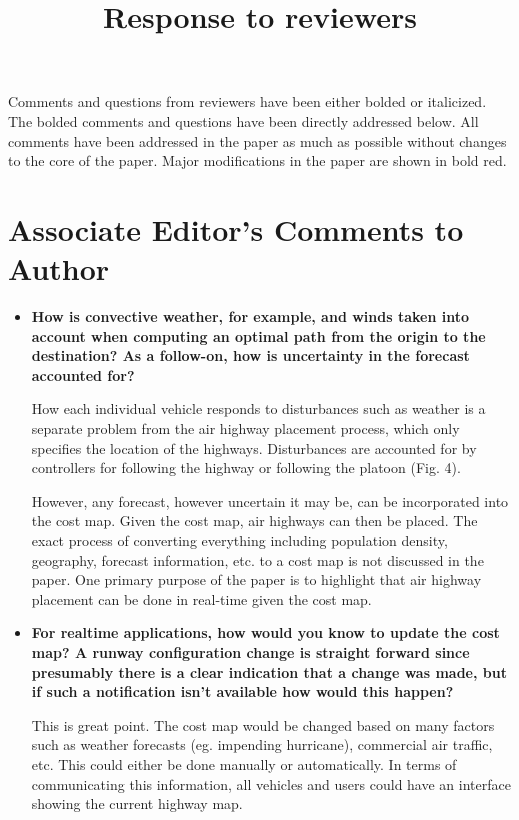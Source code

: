 \documentclass[submit]{aiaa-pretty}
\title{Response to reviewers}
\begin{document}
\maketitle

Comments and questions from reviewers have been either bolded or italicized. The bolded comments and questions have been directly addressed below. All comments have been addressed in the paper as much as possible without changes to the core of the paper. Major modifications in the paper are shown in bold red.

\section{Associate Editor's Comments to Author}
\begin{itemize}
\item\textbf{How is convective weather, for example, and winds taken into account when computing an optimal path from the origin to the destination?  As a follow-on, how is uncertainty in the forecast accounted for?}

How each individual vehicle responds to disturbances such as weather is a separate problem from the air highway placement process, which only specifies the location of the highways. Disturbances are accounted for by controllers for following the highway or following the platoon (Fig. 4). 

However, any forecast, however uncertain it may be, can be incorporated into the cost map. Given the cost map, air highways can then be placed. The exact process of converting everything including population density, geography, forecast information, etc. to a cost map is not discussed in the paper. One primary purpose of the paper is to highlight that air highway placement can be done in real-time given the cost map.

\item\textbf{For realtime applications, how would you know to update the cost map?  A runway configuration change is straight forward since presumably there is a clear indication that a change was made, but if such a notification isn’t available how would this happen?}

This is great point. The cost map would be changed based on many factors such as weather forecasts (eg. impending hurricane), commercial air traffic, etc. This could either be done manually or automatically. In terms of communicating this information, all vehicles and users could have an interface showing the current highway map. 


\end{itemize}
\end{document}
